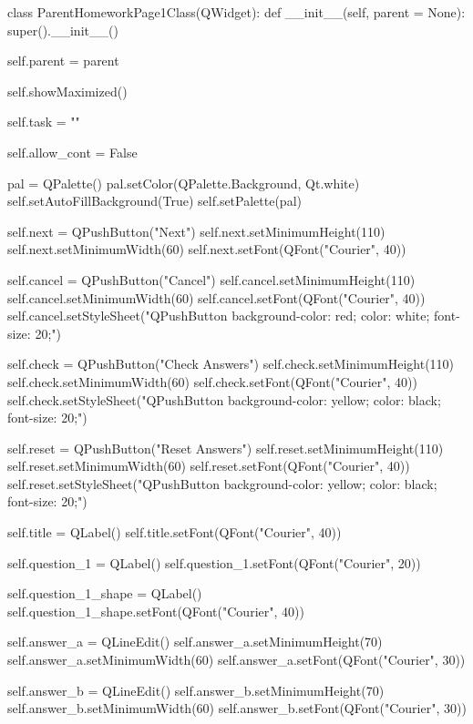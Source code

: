 \begin{python}
class ParentHomeworkPage1Class(QWidget):
    def __init__(self, parent = None):
        super().__init__()

        self.parent = parent
        
        self.showMaximized()

        self.task = ""

        self.allow_cont = False

        pal = QPalette()
        pal.setColor(QPalette.Background, Qt.white)
        self.setAutoFillBackground(True)
        self.setPalette(pal)     

        self.next = QPushButton("Next")
        self.next.setMinimumHeight(110)
        self.next.setMinimumWidth(60)
        self.next.setFont(QFont("Courier", 40))

        self.cancel = QPushButton("Cancel")
        self.cancel.setMinimumHeight(110)
        self.cancel.setMinimumWidth(60)
        self.cancel.setFont(QFont("Courier", 40))
        self.cancel.setStyleSheet("QPushButton {background-color: red; color: white; font-size: 20;}")
        
        self.check = QPushButton("Check Answers")
        self.check.setMinimumHeight(110)
        self.check.setMinimumWidth(60)
        self.check.setFont(QFont("Courier", 40))
        self.check.setStyleSheet("QPushButton {background-color: yellow; color: black; font-size: 20;}")
        
        self.reset = QPushButton("Reset Answers")
        self.reset.setMinimumHeight(110)
        self.reset.setMinimumWidth(60)
        self.reset.setFont(QFont("Courier", 40))
        self.reset.setStyleSheet("QPushButton {background-color: yellow; color: black; font-size: 20;}")

        self.title = QLabel()
        self.title.setFont(QFont("Courier", 40))

        self.question_1 = QLabel()
        self.question_1.setFont(QFont("Courier", 20))

        self.question_1_shape = QLabel()
        self.question_1_shape.setFont(QFont("Courier", 40))
        
        self.answer_a = QLineEdit()
        self.answer_a.setMinimumHeight(70)
        self.answer_a.setMinimumWidth(60)
        self.answer_a.setFont(QFont("Courier", 30))
        
        self.answer_b = QLineEdit()
        self.answer_b.setMinimumHeight(70)
        self.answer_b.setMinimumWidth(60)
        self.answer_b.setFont(QFont("Courier", 30))
        

\end{python}
